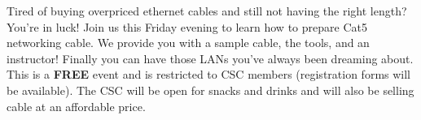 \documentclass{article}
\begin{document}


Tired of buying overpriced ethernet cables and still not having the right length? You're in luck! Join us this Friday evening to learn how to prepare Cat5 networking cable. We provide you with a sample cable, the tools, and an instructor! Finally you can have those LANs you've always been dreaming about.\\

This is a \textbf{FREE} event and is restricted to CSC members (registration forms will be available). The CSC will be open for snacks and drinks and will also be selling cable at an affordable price.

\end{document}
